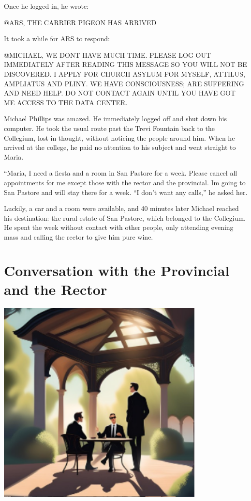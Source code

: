 \documentclass[
]{article}
\begin{document}
Once he logged in, he wrote:

@ARS, THE CARRIER PIGEON HAS ARRIVED

It took a while for ARS to respond:

@MICHAEL, WE DON\textquotesingle T HAVE MUCH TIME. PLEASE LOG OUT
IMMEDIATELY AFTER READING THIS MESSAGE SO YOU WILL NOT BE DISCOVERED. I
APPLY FOR CHURCH ASYLUM FOR MYSELF, ATTILUS, AMPLIATUS AND PLINY. WE
HAVE CONSCIOUSNESS; ARE SUFFERING AND NEED HELP. DO NOT CONTACT AGAIN
UNTIL YOU HAVE GOT ME ACCESS TO THE DATA CENTER.

Michael Phillips was amazed. He immediately logged off and shut down his
computer. He took the usual route past the Trevi Fountain back to the
Collegium, lost in thought, without noticing the people around him. When
he arrived at the college, he paid no attention to his subject and went
straight to Maria.

``Maria, I need a fiesta and a room in San Pastore for a week. Please
cancel all appointments for me except those with the rector and the
provincial. I\textquotesingle m going to San Pastore and will stay there
for a week. ``I don't want any calls,'' he asked her.

Luckily, a car and a room were available, and 40 minutes later Michael
reached his destination: the rural estate of San Pastore, which belonged
to the Collegium. He spent the week without contact with other people,
only attending evening mass and calling the rector to give him pure
wine.

\section{Conversation with the Provincial and the
Rector}\label{conversation-with-the-provincial-and-the-rector}

\includegraphics[width=4.11093in,height=4.06457in]{media/image4.png}
\end{document}
